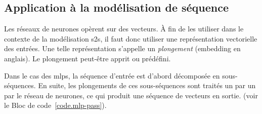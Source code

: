 \subsection{Application à la modélisation de séquence}

Les réseaux de neurones opèrent sur des vecteurs.
À fin de les utiliser dans le contexte de la modélisation \gls{s2s}, 
il faut donc utiliser une représentation vectorielle des entrées.
Une telle représentation s'appelle un \emph{plongement} (\foreignlanguage{english}{embedding} en anglais).
Le plongement peut-être apprit ou prédéfini.

Dans le cas des \glspl{mlp}, la séquence d'entrée est d'abord décomposée en sous-séquences.
En suite, les plongements de ces sous-séquences sont traités un par un par le réseau de neurones,
ce qui produit une séquence de vecteurs en sortie.
(voir le Bloc de code~\ref{code.mlp-pass}).



